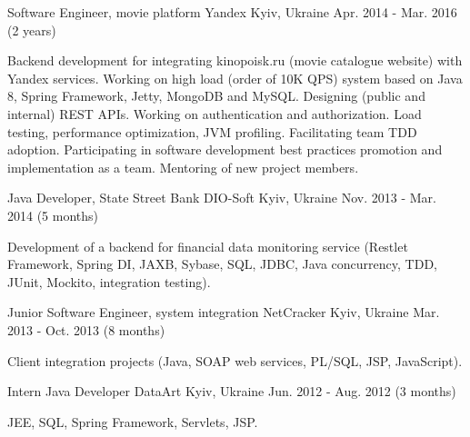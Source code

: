 \begin{cventries}
  \cventry
    {Software Engineer, movie platform} %
    {Yandex} %
    {Kyiv, Ukraine} %
    {Apr. 2014 - Mar. 2016 (2 years)} %
    {
      \begin{cvitems} %
        \item {Backend development for integrating kinopoisk.ru (movie catalogue website) with Yandex services. Working on high load (order of 10K QPS) system based on Java 8, Spring Framework, Jetty, MongoDB and MySQL. Designing (public and internal) REST APIs. Working on authentication and authorization. Load testing, performance optimization, JVM profiling. Facilitating team TDD adoption. Participating in software development best practices promotion and implementation as a team. Mentoring of new project members.}
      \end{cvitems}
    }

  \cventry
    {Java Developer, State Street Bank} %
    {DIO-Soft} %
    {Kyiv, Ukraine} %
    {Nov. 2013 - Mar. 2014 (5 months)} %
    {
      \begin{cvitems} %
        \item {Development of a backend for financial data monitoring service (Restlet Framework, Spring DI, JAXB, Sybase, SQL, JDBC, Java concurrency, TDD, JUnit, Mockito, integration testing).}
      \end{cvitems}
    }

  \cventry
    {Junior Software Engineer, system integration} %
    {NetCracker} %
    {Kyiv, Ukraine} %
    {Mar. 2013 - Oct. 2013 (8 months)} %
    {
      \begin{cvitems} %
        \item {Client integration projects (Java, SOAP web services, PL/SQL, JSP, JavaScript).}
      \end{cvitems}
    }

  \cventry
    {Intern Java Developer} %
    {DataArt} %
    {Kyiv, Ukraine} %
    {Jun. 2012 - Aug. 2012 (3 months)} %
    {
      \begin{cvitems} %
        \item {JEE, SQL, Spring Framework, Servlets, JSP.}
      \end{cvitems}
    }

\end{cventries}
